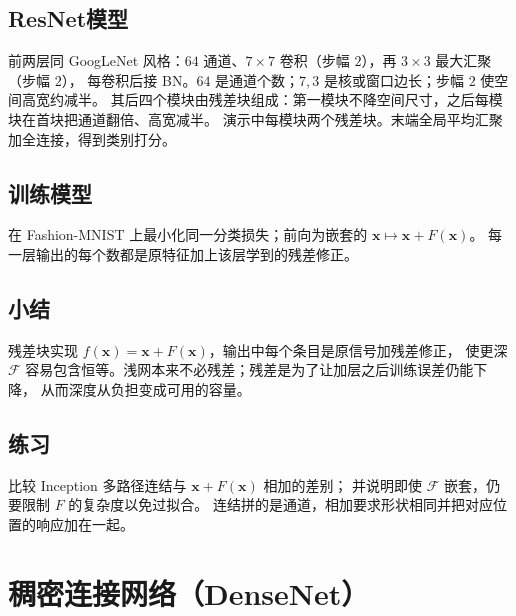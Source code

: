 \subsection{ResNet模型}

前两层同 GoogLeNet 风格：$64$ 通道、$7\times 7$ 卷积（步幅 $2$），再 $3\times 3$ 最大汇聚（步幅 $2$），
每卷积后接 BN。$64$ 是通道个数；$7,3$ 是核或窗口边长；步幅 $2$ 使空间高宽约减半。
其后四个模块由残差块组成：第一模块不降空间尺寸，之后每模块在首块把通道翻倍、高宽减半。
演示中每模块两个残差块。末端全局平均汇聚加全连接，得到类别打分。

\subsection{训练模型}

在 Fashion-MNIST 上最小化同一分类损失；前向为嵌套的 $\bm{x}\mapsto\bm{x}+F(\bm{x})$。
每一层输出的每个数都是原特征加上该层学到的残差修正。

\subsection{小结}

残差块实现 $f(\bm{x})=\bm{x}+F(\bm{x})$，输出中每个条目是原信号加残差修正，
使更深 $\mathcal{F}$ 容易包含恒等。浅网本来不必残差；残差是为了让加层之后训练误差仍能下降，
从而深度从负担变成可用的容量。

\subsection{练习}

比较 Inception 多路径连结与 $\bm{x}+F(\bm{x})$ 相加的差别；
并说明即使 $\mathcal{F}$ 嵌套，仍要限制 $F$ 的复杂度以免过拟合。
连结拼的是通道，相加要求形状相同并把对应位置的响应加在一起。

\section{稠密连接网络（DenseNet）}




